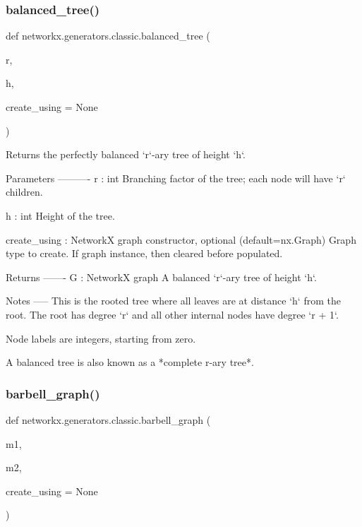 \subsubsection{\texorpdfstring{balanced\+\_\+tree()}{balanced\_tree()}}
{\footnotesize\ttfamily def networkx.\+generators.\+classic.\+balanced\+\_\+tree (\begin{DoxyParamCaption}\item[{}]{r,  }\item[{}]{h,  }\item[{}]{create\+\_\+using = {\ttfamily None} }\end{DoxyParamCaption})}

\begin{DoxyVerb}Returns the perfectly balanced `r`-ary tree of height `h`.

Parameters
----------
r : int
    Branching factor of the tree; each node will have `r`
    children.

h : int
    Height of the tree.

create_using : NetworkX graph constructor, optional (default=nx.Graph)
   Graph type to create. If graph instance, then cleared before populated.

Returns
-------
G : NetworkX graph
    A balanced `r`-ary tree of height `h`.

Notes
-----
This is the rooted tree where all leaves are at distance `h` from
the root. The root has degree `r` and all other internal nodes
have degree `r + 1`.

Node labels are integers, starting from zero.

A balanced tree is also known as a *complete r-ary tree*.\end{DoxyVerb}
 \mbox{\label{namespacenetworkx_1_1generators_1_1classic_a19042a529358323ae61e72f1bae99690}} 
\subsubsection{\texorpdfstring{barbell\+\_\+graph()}{barbell\_graph()}}
{\footnotesize\ttfamily def networkx.\+generators.\+classic.\+barbell\+\_\+graph (\begin{DoxyParamCaption}\item[{}]{m1,  }\item[{}]{m2,  }\item[{}]{create\+\_\+using = {\ttfamily None} }\end{DoxyParamCaption})}


